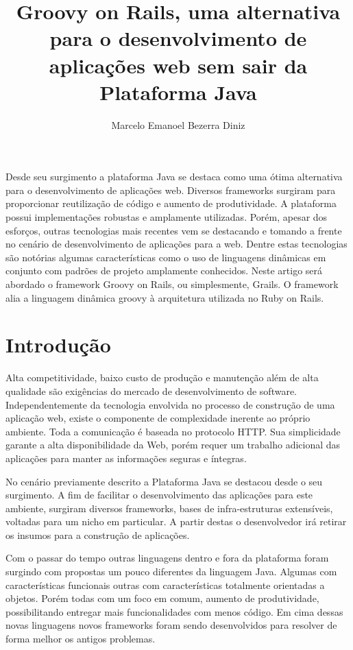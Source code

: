 \documentclass[12pt]{article}
\title{Groovy on Rails, uma alternativa para o desenvolvimento de aplicações web sem sair da Plataforma Java}
\author{Marcelo Emanoel Bezerra Diniz\inst{1}}
\begin{document}
 

\maketitle

\begin{resumo} 
    Desde seu surgimento a plataforma Java se destaca como uma ótima alternativa para o desenvolvimento de aplicações web.
    Diversos frameworks surgiram para proporcionar reutilização de código e aumento de produtividade. A plataforma possui 
    implementações robustas e amplamente utilizadas. Porém, apesar dos esforços, outras tecnologias mais recentes vem se 
    destacando e tomando a frente no cenário de desenvolvimento de aplicações para a web. Dentre estas tecnologias são notórias
    algumas características como o uso de linguagens dinâmicas em conjunto com padrões de projeto amplamente conhecidos.
    Neste artigo será abordado o framework Groovy on Rails, ou simplesmente, Grails. O framework alia a linguagem dinâmica groovy
    à arquitetura utilizada no Ruby on Rails. 
\end{resumo}

\section{Introdução}
    Alta competitividade, baixo custo de produção e manutenção além de alta qualidade são exigências do mercado de desenvolvimento
    de software. Independentemente da tecnologia envolvida no processo de construção de uma aplicação web, existe o componente de 
    complexidade inerente ao próprio ambiente. Toda a comunicação é baseada no protocolo HTTP. Sua simplicidade garante a alta 
    disponibilidade da Web, porém requer um trabalho adicional das aplicações para manter as informações seguras e íntegras.

    No cenário previamente descrito a Plataforma Java se destacou desde o seu surgimento. A fim de facilitar o desenvolvimento
    das aplicações para este ambiente, surgiram diversos frameworks, bases de infra-estruturas extensíveis, voltadas para um nicho
    em particular. A partir destas o desenvolvedor irá retirar os insumos para a construção de aplicações.

    Com o passar do tempo outras linguagens dentro e fora da plataforma foram surgindo com propostas um pouco diferentes da linguagem
    Java. Algumas com características funcionais outras com características totalmente orientadas a objetos. Porém todas com um foco 
    em comum, aumento de produtividade, possibilitando entregar mais funcionalidades com menos código. Em cima dessas novas linguagens
    novos frameworks foram sendo desenvolvidos para resolver de forma melhor os antigos problemas.
    
\end{document}
